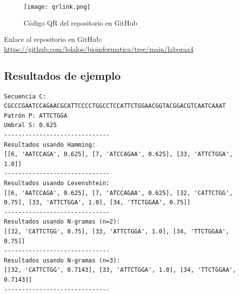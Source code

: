 \documentclass[fleqn,10pt]{article}
\begin{document}
\begin{figure}[h!]
    \centering
    \texttt{[image: qrlink.png]}
    \caption{Código QR del repositorio en GitHub}
    \label{fig:qr_github}
\end{figure}

\noindent
Enlace al repositorio en GitHub: \url{https://github.com/lolalos/bioinformatica/tree/main/laboraa4}
\subsection{Resultados de ejemplo}
\begin{verbatim}
Secuencia C: CGCCCGAATCCAGAACGCATTCCCCTGGCCTCCATTCTGGAACGGTACGGACGTCAATCAAAT
Patrón P: ATTCTGGA
Umbral S: 0.625
------------------------------
Resultados usando Hamming:
[[6, 'AATCCAGA', 0.625], [7, 'ATCCAGAA', 0.625], [33, 'ATTCTGGA', 1.0]]
------------------------------
Resultados usando Levenshtein:
[[6, 'AATCCAGA', 0.625], [7, 'ATCCAGAA', 0.625], [32, 'CATTCTGG', 0.75], [33, 'ATTCTGGA', 1.0], [34, 'TTCTGGAA', 0.75]]
------------------------------
Resultados usando N-gramas (n=2):
[[32, 'CATTCTGG', 0.75], [33, 'ATTCTGGA', 1.0], [34, 'TTCTGGAA', 0.75]]
------------------------------
Resultados usando N-gramas (n=3):
[[32, 'CATTCTGG', 0.7143], [33, 'ATTCTGGA', 1.0], [34, 'TTCTGGAA', 0.7143]]
------------------------------
\end{verbatim}
\end{document}
